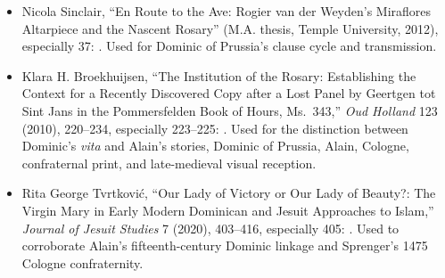 \begin{itemize}
  \item Nicola Sinclair, ``En Route to the Ave: Rogier van der Weyden's Miraflores Altarpiece and the Nascent Rosary'' (M.A. thesis, Temple University, 2012), especially 37: . Used for Dominic of Prussia's clause cycle and transmission.
  \item Klara H. Broekhuijsen, ``The Institution of the Rosary: Establishing the Context for a Recently Discovered Copy after a Lost Panel by Geertgen tot Sint Jans in the Pommersfelden Book of Hours, Ms.~343,'' \emph{Oud Holland} 123 (2010), 220--234, especially 223--225: . Used for the distinction between Dominic's \emph{vita} and Alain's stories, Dominic of Prussia, Alain, Cologne, confraternal print, and late-medieval visual reception.
  \item Rita George Tvrtkovi\'c, ``Our Lady of Victory or Our Lady of Beauty?: The Virgin Mary in Early Modern Dominican and Jesuit Approaches to Islam,'' \emph{Journal of Jesuit Studies} 7 (2020), 403--416, especially 405: . Used to corroborate Alain's fifteenth-century Dominic linkage and Sprenger's 1475 Cologne confraternity.
\end{itemize}

\endgroup
